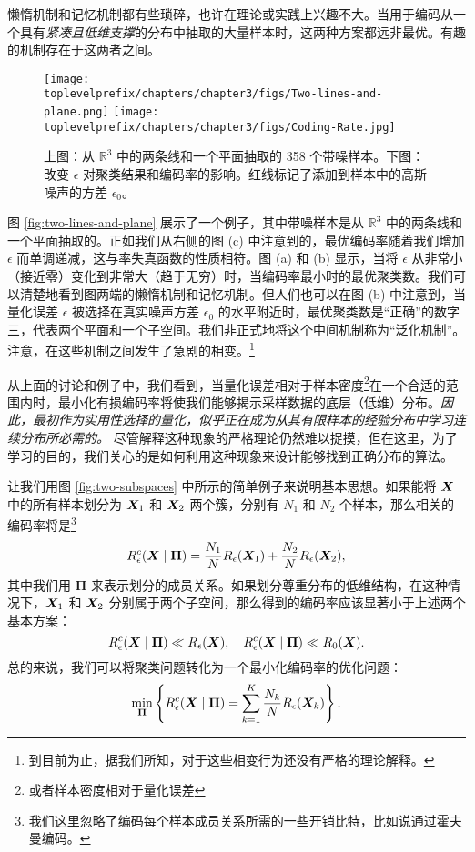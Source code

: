 \documentclass[../../book-main_zh.tex]{subfiles}
\begin{document}
懒惰机制和记忆机制都有些琐碎，也许在理论或实践上兴趣不大。当用于编码从一个具有{\em 紧凑且低维支撑}的分布中抽取的大量样本时，这两种方案都远非最优。有趣的机制存在于这两者之间。
\begin{example}
	\begin{figure}[t]
		\centering
		\texttt{[image: \\toplevelprefix/chapters/chapter3/figs/Two-lines-and-plane.png]}
		\texttt{[image: \\toplevelprefix/chapters/chapter3/figs/Coding-Rate.jpg]}
		\caption{上图：从 $\mathbb{R}^3$ 中的两条线和一个平面抽取的 358 个带噪样本。下图：改变 $\epsilon$ 对聚类结果和编码率的影响。红线标记了添加到样本中的高斯噪声的方差 $\epsilon_0$。}
		\label{fig:two-lines-and-plane}
		\label{fig:two-lines-and-plane-epsilon}
	\end{figure}
	图 \ref{fig:two-lines-and-plane} 展示了一个例子，其中带噪样本是从 $\mathbb{R}^3$ 中的两条线和一个平面抽取的。正如我们从右侧的图 (c) 中注意到的，最优编码率随着我们增加 $\epsilon$ 而单调递减，这与率失真函数的性质相符。图 (a) 和 (b) 显示，当将 $\epsilon$ 从非常小（接近零）变化到非常大（趋于无穷）时，当编码率最小时的最优聚类数。我们可以清楚地看到图两端的懒惰机制和记忆机制。但人们也可以在图 (b) 中注意到，当量化误差 $\epsilon$ 被选择在真实噪声方差 $\epsilon_0$ 的水平附近时，最优聚类数是“正确”的数字三，代表两个平面和一个子空间。我们非正式地将这个中间机制称为“泛化机制”。注意，在这些机制之间发生了急剧的相变。\footnote{到目前为止，据我们所知，对于这些相变行为还没有严格的理论解释。}
\end{example}


从上面的讨论和例子中，我们看到，当量化误差相对于样本密度\footnote{或者样本密度相对于量化误差}在一个合适的范围内时，最小化有损编码率将使我们能够揭示采样数据的底层（低维）分布。{\em 因此，最初作为实用性选择的量化，似乎正在成为从其有限样本的经验分布中学习连续分布所必需的。} 尽管解释这种现象的严格理论仍然难以捉摸，但在这里，为了学习的目的，我们关心的是如何利用这种现象来设计能够找到正确分布的算法。

让我们用图 \ref{fig:two-subspaces} 中所示的简单例子来说明基本思想。如果能将 $\bm{X}$ 中的所有样本划分为 $\bm{X}_1$ 和 $\bm{X}_2$ 两个簇，分别有 $N_1$ 和 $N_2$ 个样本，那么相关的编码率将是\footnote{我们这里忽略了编码每个样本成员关系所需的一些开销比特，比如说通过霍夫曼编码。}
\begin{equation}
	R_{\epsilon}^c(\bm{X}\mid \boldsymbol{\Pi}) = \frac{N_1}{N}R_{\epsilon}(\bm{X}_1) + \frac{N_2}{N}R_{\epsilon}(\bm{X}_2),
\end{equation}
其中我们用 $\boldsymbol{\Pi}$ 来表示划分的成员关系。如果划分尊重分布的低维结构，在这种情况下，$\bm{X}_1$ 和 $\bm{X}_2$ 分别属于两个子空间，那么得到的编码率应该显著小于上述两个基本方案：
\begin{equation}
	R_{\epsilon}^c(\bm{X} \mid \boldsymbol{\Pi}) \ll R_{\epsilon}(\bm{X}), \quad     R_{\epsilon}^c(\bm{X} \mid \boldsymbol{\Pi}) \ll R_0(\bm{X}).
\end{equation}
总的来说，我们可以将聚类问题转化为一个最小化编码率的优化问题：
\begin{equation}
	\min_{\boldsymbol{\Pi}}  \left\{ R_{\epsilon}^c(\bm{X} \mid \boldsymbol{\Pi}) = \sum_{k=1}^K \frac{N_k}{N}R_{\epsilon}(\bm{X}_k)\right\}.
\end{equation}
\end{document}

